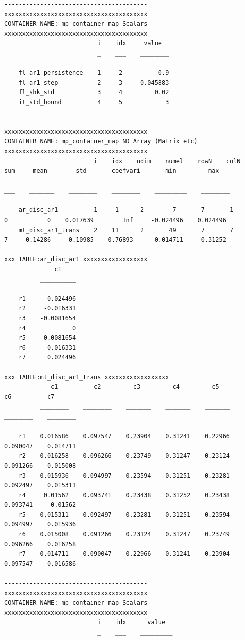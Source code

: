 \documentclass[
]{book}
\begin{document}
\begin{verbatim}
----------------------------------------
xxxxxxxxxxxxxxxxxxxxxxxxxxxxxxxxxxxxxxxx
CONTAINER NAME: mp_container_map Scalars
xxxxxxxxxxxxxxxxxxxxxxxxxxxxxxxxxxxxxxxx
                          i    idx     value  
                          _    ___    ________

    fl_ar1_persistence    1     2          0.9
    fl_ar1_step           2     3     0.045883
    fl_shk_std            3     4         0.02
    it_std_bound          4     5            3

----------------------------------------
xxxxxxxxxxxxxxxxxxxxxxxxxxxxxxxxxxxxxxxx
CONTAINER NAME: mp_container_map ND Array (Matrix etc)
xxxxxxxxxxxxxxxxxxxxxxxxxxxxxxxxxxxxxxxx
                         i    idx    ndim    numel    rowN    colN    sum     mean        std       coefvari       min         max   
                         _    ___    ____    _____    ____    ____    ___    _______    ________    ________    _________    ________

    ar_disc_ar1          1     1      2        7       7       1       0           0    0.017639        Inf     -0.024496    0.024496
    mt_disc_ar1_trans    2    11      2       49       7       7       7     0.14286     0.10985    0.76893      0.014711     0.31252

xxx TABLE:ar_disc_ar1 xxxxxxxxxxxxxxxxxx
              c1    
          __________

    r1     -0.024496
    r2     -0.016331
    r3    -0.0081654
    r4             0
    r5     0.0081654
    r6      0.016331
    r7      0.024496

xxx TABLE:mt_disc_ar1_trans xxxxxxxxxxxxxxxxxx
             c1          c2         c3         c4         c5          c6          c7   
          ________    ________    _______    _______    _______    ________    ________

    r1    0.016586    0.097547    0.23904    0.31241    0.22966    0.090047    0.014711
    r2    0.016258    0.096266    0.23749    0.31247    0.23124    0.091266    0.015008
    r3    0.015936    0.094997    0.23594    0.31251    0.23281    0.092497    0.015311
    r4     0.01562    0.093741    0.23438    0.31252    0.23438    0.093741     0.01562
    r5    0.015311    0.092497    0.23281    0.31251    0.23594    0.094997    0.015936
    r6    0.015008    0.091266    0.23124    0.31247    0.23749    0.096266    0.016258
    r7    0.014711    0.090047    0.22966    0.31241    0.23904    0.097547    0.016586

----------------------------------------
xxxxxxxxxxxxxxxxxxxxxxxxxxxxxxxxxxxxxxxx
CONTAINER NAME: mp_container_map Scalars
xxxxxxxxxxxxxxxxxxxxxxxxxxxxxxxxxxxxxxxx
                          i    idx      value  
                          _    ___    _________


\end{verbatim}
\end{document}

